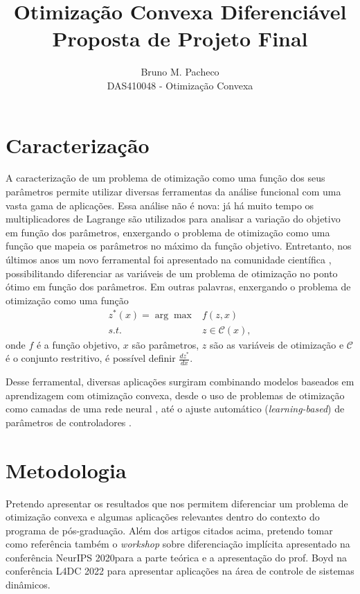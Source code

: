 \documentclass[a4paper]{report}
\begin{document}
\renewcommand{\bibname}{Referências}
 
\title{Otimização Convexa Diferenciável\\Proposta de Projeto Final}
\author{Bruno M. Pacheco\\
DAS410048 - Otimização Convexa}
 
\maketitle

\section*{Caracterização}

A caracterização de um problema de otimização como uma função dos seus parâmetros permite utilizar diversas ferramentas da análise funcional com uma vasta gama de aplicações.
Essa análise não é nova: já há muito tempo os multiplicadores de Lagrange são utilizados para analisar a variação do objetivo em função dos parâmetros, enxergando o problema de otimização como uma função que mapeia os parâmetros no máximo da função objetivo.
Entretanto, nos últimos anos um novo ferramental foi apresentado na comunidade científica \cite{agrawal2019}, possibilitando diferenciar as variáveis de um problema de otimização no ponto ótimo em função dos parâmetros.
Em outras palavras, enxergando o problema de otimização como uma função
\begin{align*}
    z^*(x) = \arg\max & f(z,x) \\
	s.t. \quad & z \in \mathcal{C}(x)
,\end{align*}
onde $f$ é a função objetivo, $x$ são parâmetros, $z$ são as variáveis de otimização e $\mathcal{C}$ é o conjunto restritivo, é possível definir $\frac{d z^*}{d x}$. 

Desse ferramental, diversas aplicações surgiram combinando modelos baseados em aprendizagem com otimização convexa, desde o uso de problemas de otimização como camadas de uma rede neural \cite{amos2017}, até o ajuste automático (\emph{learning-based}) de parâmetros de controladores \cite{amos2018,avila2018}.

\section*{Metodologia}

Pretendo apresentar os resultados que nos permitem diferenciar um problema de otimização convexa e algumas aplicações relevantes dentro do contexto do programa de pós-graduação.
Além dos artigos citados acima, pretendo tomar como referência também o \emph{workshop} sobre diferenciação implícita apresentado na conferência NeurIPS 2020\footnotemark para a parte teórica e a apresentação do prof. Boyd na conferência L4DC 2022 \footnotemark para apresentar aplicações na área de controle de sistemas dinâmicos.
\end{document}
